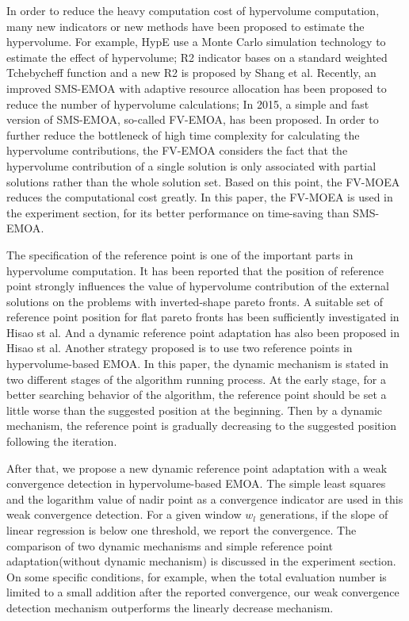 \documentclass[conference]{IEEEtran}
\begin{document}
In order to reduce the heavy computation cost of hypervolume computation, 
many new indicators or new methods have been proposed to estimate the hypervolume. 
For example, HypE use a Monte Carlo simulation technology to estimate the effect of hypervolume\cite{HypE}; 
R2 indicator bases on a standard weighted Tchebycheff function\cite{R2} and a new R2 is proposed by Shang et al\cite{newR2}.
Recently, an improved SMS-EMOA with adaptive resource allocation has been proposed to reduce the number of hypervolume calculations\cite{ismsemoa}; 
In 2015, a simple and fast version of SMS-EMOA\cite{smsemoa}, so-called FV-EMOA, has been proposed\cite{FVEMOA}.
In order to further reduce the bottleneck of high time complexity for calculating the hypervolume contributions, 
the FV-EMOA considers the fact that the hypervolume contribution of a single solution 
is only associated with partial solutions rather than the whole solution set\cite{FVEMOA}. 
Based on this point, the FV-MOEA reduces the computational cost greatly. 
In this paper, the FV-MOEA is used in the experiment section, 
for its better performance on time-saving than SMS-EMOA\cite{FVEMOA}. 

The specification of the reference point is one of the important parts in hypervolume computation. 
It has been reported that the position of reference point strongly influences the value of
hypervolume contribution of the external solutions on the problems with inverted-shape pareto fronts\cite{hisao:RPhowtoSpecify, hisao:RPspecify, hisao:RPexplanation}. 
A suitable set of reference point position for flat pareto fronts has been sufficiently investigated in Hisao st al\cite{hisao:RPspecify}.
And a dynamic reference point adaptation has also been proposed in Hisao st al\cite{hisao:dynamic}.
Another strategy proposed is to use two reference points in hypervolume-based EMOA\cite{hisao:twoRP}. 
In this paper, the dynamic mechanism is stated in two different stages of the algorithm running process. 
At the early stage, for a better searching behavior of the algorithm, 
the reference point should be set a little worse than the suggested position at the beginning.
Then by a dynamic mechanism, the reference point is gradually decreasing to the suggested position following the iteration. 

After that, we propose a new dynamic reference point adaptation with a weak convergence detection in hypervolume-based EMOA. 
The simple least squares and the logarithm value of nadir point as a convergence indicator are used in this weak convergence detection. 
For a given window $w_l$ generations, if the slope of linear regression is below one threshold, we report the convergence.
The comparison of two dynamic mechanisms and simple reference point adaptation(without dynamic mechanism) is 
discussed in the experiment section. On some specific conditions, for example, when the total evaluation number 
is limited to a small addition after the reported convergence, our weak convergence detection mechanism 
outperforms the linearly decrease mechanism. 
\end{document}
